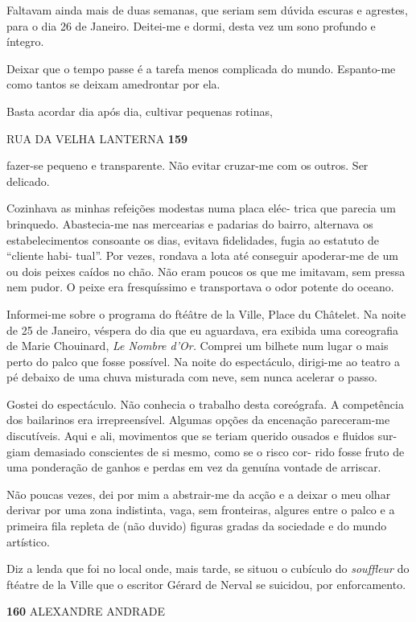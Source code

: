 Faltavam ainda mais de duas semanas, que seriam sem dúvida escuras e
agrestes, para o dia 26 de Janeiro. Deitei-me e dormi, desta vez um sono
profundo e íntegro.

Deixar que o tempo passe é a tarefa menos complicada do mundo.
Espanto-me como tantos se deixam amedrontar por ela.

Basta acordar dia após dia, cultivar pequenas rotinas,

RUA DA VELHA LANTERNA \textbf{159}

fazer-se pequeno e transparente. Não evitar cruzar-me com os outros. Ser
delicado.

Cozinhava as minhas refeições modestas numa placa eléc- trica que
parecia um brinquedo. Abastecia-me nas mercearias e padarias do bairro,
alternava os estabelecimentos consoante os dias, evitava fidelidades,
fugia ao estatuto de ``cliente habi- tual''. Por vezes, rondava a lota
até conseguir apoderar-me de um ou dois peixes caídos no chão. Não eram
poucos os que me imitavam, sem pressa nem pudor. O peixe era
fresquíssimo e transportava o odor potente do oceano.

Informei-me sobre o programa do ftéâtre de la Ville, Place du Châtelet.
Na noite de 25 de Janeiro, véspera do dia que eu aguardava, era exibida
uma coreografia de Marie Chouinard, \emph{Le Nombre d'Or. }Comprei um
bilhete num lugar o mais perto do palco que fosse possível. Na noite do
espectáculo, dirigi-me ao teatro a pé debaixo de uma chuva misturada com
neve, sem nunca acelerar o passo.

Gostei do espectáculo. Não conhecia o trabalho desta coreógrafa. A
competência dos bailarinos era irrepreensível. Algumas opções da
encenação pareceram-me discutíveis. Aqui e ali, movimentos que se teriam
querido ousados e fluidos sur- giam demasiado conscientes de si mesmo,
como se o risco cor- rido fosse fruto de uma ponderação de ganhos e
perdas em vez da genuína vontade de arriscar.

Não poucas vezes, dei por mim a abstrair-me da acção e a deixar o meu
olhar derivar por uma zona indistinta, vaga, sem fronteiras, algures
entre o palco e a primeira fila repleta de (não duvido) figuras gradas
da sociedade e do mundo artístico.

Diz a lenda que foi no local onde, mais tarde, se situou o cubículo do
\emph{souffleur }do ftéatre de la Ville que o escritor Gérard de Nerval
se suicidou, por enforcamento.

\textbf{160 }ALEXANDRE ANDRADE


